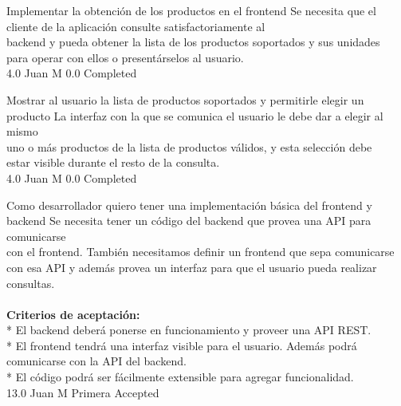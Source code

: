 		{Implementar la obtención de los productos en el frontend} %
		{Se necesita que el cliente de la aplicación consulte satisfactoriamente al\\
backend y pueda obtener la lista de los productos soportados y sus unidades\\
para operar con ellos o presentárselos al usuario.\\
} %
		{4.0} %
		{Juan M} %
		{0.0} %
		{Completed} %

		{Mostrar al usuario la lista de productos soportados y permitirle elegir un producto} %
		{La interfaz con la que se comunica el usuario le debe dar a elegir al mismo\\
uno o más productos de la lista de productos válidos, y esta selección debe\\
estar visible durante el resto de la consulta.\\
} %
		{4.0} %
		{Juan M} %
		{0.0} %
		{Completed} %


\vspace{20pt}

	{Como desarrollador quiero tener una implementación básica del frontend y backend} %
	{Se necesita tener un código del backend que provea una API para comunicarse\\
con el frontend. También necesitamos definir un frontend que sepa comunicarse\\
con esa API y además provea un interfaz para que el usuario pueda realizar\\
consultas.\\
  \\
\textbf{Criterios de aceptación:}\\
* El backend deberá ponerse en funcionamiento y proveer una API REST.  \\
* El frontend tendrá una interfaz visible para el usuario. Además podrá comunicarse con la API del backend.  \\
* El código podrá ser fácilmente extensible para agregar funcionalidad.\\
} %
	{} %
	{13.0} %
	{Juan M} %
	{Primera} %
	{Accepted} %

